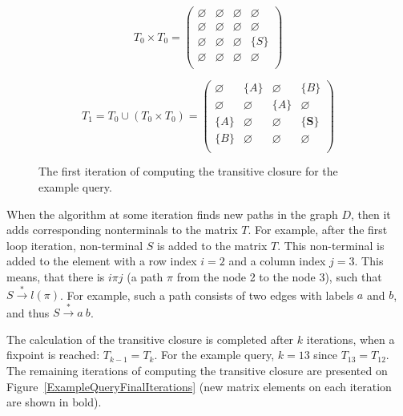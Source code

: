 \begin{figure}[h]
\[
T_0 \times T_0 = \begin{pmatrix}
	\varnothing & \varnothing & \varnothing & \varnothing \\
	\varnothing & \varnothing & \varnothing & \varnothing \\
	\varnothing & \varnothing & \varnothing & \{S\}       \\
	\varnothing & \varnothing & \varnothing & \varnothing \\
\end{pmatrix}
\]

\[
T_1 = T_0 \cup (T_0 \times T_0) = \begin{pmatrix}
	\varnothing & \{A\}       & \varnothing & \{B\}       \\
	\varnothing & \varnothing & \{A\}       & \varnothing \\
	\{A\}       & \varnothing & \varnothing & \{\pmb{S}\}       \\
	\{B\}       & \varnothing & \varnothing & \varnothing \\
\end{pmatrix}
\]
\caption{The first iteration of computing the transitive closure for the example query.}
\label{ExampleQueryFirstIteration}
\end{figure}

When the algorithm at some iteration finds new paths in the graph $D$, then it adds corresponding nonterminals to the matrix $T$. For example, after the first loop iteration, non-terminal $S$ is added to the matrix $T$. This non-terminal is added to the element with a row index $i = 2$ and a column index $j = 3$. This means, that there is $i\pi j$ (a path $\pi$ from the node 2 to the node 3), such that $S \xrightarrow{*} l(\pi)$. For example, such a path consists of two edges with labels $a$ and $b$, and thus $S \xrightarrow{*} a \ b$.

The calculation of the transitive closure is completed after $k$ iterations, when a fixpoint is reached: $T_{k-1} = T_k$. For the example query, $k = 13$ since $T_{13} = T_{12}$. The remaining iterations of computing the transitive closure are presented on Figure~\ref{ExampleQueryFinalIterations} (new matrix elements on each iteration are shown in bold).

